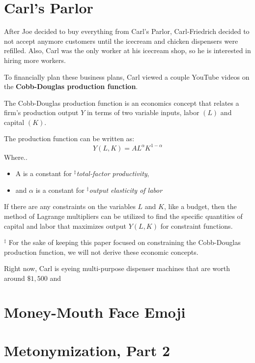 \setcounter{chapter}{7}
\chapter{Carl's Parlor}
After Joe decided to buy everything from Carl's Parlor, Carl-Friedrich decided to not accept anymore customers until the icecream and chicken dispensers were refilled.
Also, Carl was the only worker at his icecream shop, so he is interested in hiring more workers.

To financially plan these business plans, Carl viewed a couple YouTube videos on the \textbf{Cobb-Douglas production function}.
\begin{remark}
	The Cobb-Douglas production function is an economics concept that relates a firm's production output $Y$ in terms of two variable inputs, labor $(L)$ and capital $(K)$.

	The production function can be written as:
	\[Y(L, K) = AL^{\alpha}K^{1 - \alpha}\]
	Where..
	\begin{itemize}
		\item A is a constant for \textit{$^\ddagger$total-factor productivity},
		\item and $\alpha$ is a constant for \textit{$^\ddagger$output elasticity of labor}
	\end{itemize}
	If there are any constraints on the variables $L$ and $K$, like a budget, then the method of Lagrange multipliers can be utilized to find the specific quantities of capital and labor that maximizes output $Y(L, K)$ for constraint functions.

	$^\ddagger$ For the sake of keeping this paper focused on constraining the Cobb-Douglas production function, we will not derive these economic concepts.
\end{remark}

Right now, Carl is eyeing multi-purpose dispenser machines that are worth around $\$1,500$ and 
\[\]
\setcounter{chapter}{8}
\chapter{Money-Mouth Face Emoji}

\setcounter{chapter}{9}
\chapter{Metonymization, Part 2}